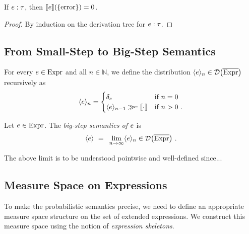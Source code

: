 %
%
\begin{theorem}
	\label{thm:small-step-well-typed}
	If $e : \tau$, then $\llbracket e \rrbracket(\{ \textnormal{error} \}) = 0$.
\end{theorem}
%
\begin{proof}
	 By induction on the derivation tree for $e : \tau$.
\end{proof}

\subsection{From Small-Step to Big-Step Semantics}
%
%
%
For every $e \in \textnormal{Expr}$ and all $n \in \mathbb{N}$, we define the distribution $\langle e \rangle_{n} \in \mathcal{D} \big( {\overline{\textnormal{Expr}}} \big)$ recursively as
%
\[
	\langle e \rangle_{n} = 
	\begin{cases}
		\delta_e & \text{if $n=0$} \\
		\langle e \rangle_{n-1} \gg\!\!= \llbracket \cdot \rrbracket & \text{if $n>0$}~.
	\end{cases}
\]
%
\begin{definition}
	Let $e \in \textnormal{Expr}$. The \emph{big-step semantics of $e$} is 
	\[
		\langle e \rangle ~{}={}~ \lim_{n \to \infty} \langle e \rangle_{n} \in \mathcal{D} \big( {\overline{\textnormal{Expr}}} \big)~.
	\]
\end{definition}
%
The above limit is to be understood pointwise and well-defined since...

\subsection{Measure Space on Expressions}

To make the probabilistic semantics precise, we need to define an appropriate measure space structure on the set of extended expressions. We construct this measure space using the notion of \emph{expression skeletons}.


